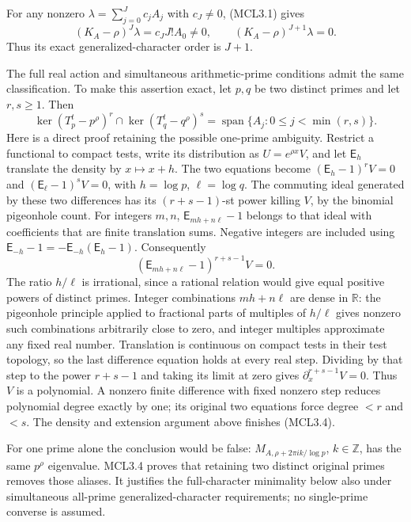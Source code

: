 For any nonzero \(\lambda=\sum_{j=0}^Jc_jA_j\) with \(c_J\ne0\),
(MCL3.1) gives \[
 (K_A-\rho)^J\lambda=c_JJ!A_0\ne0,\qquad
 (K_A-\rho)^{J+1}\lambda=0.
 \tag{MCL3.3}
\] Thus its exact generalized-character order is \(J+1\).

The full real action and simultaneous arithmetic-prime conditions admit
the same classification. To make this assertion exact, let \(p,q\) be
two distinct primes and let \(r,s\ge1\). Then \[
 \boxed{
 \ker(T_p^t-p^\rho)^r\cap\ker(T_q^t-q^\rho)^s
 =\operatorname{span}\{A_j:0\le j<\min(r,s)\}.
 }
 \tag{MCL3.4}
\] Here is a direct proof retaining the possible one-prime ambiguity.
Restrict a functional to compact tests, write its distribution as
\(U=e^{\rho x}V\), and let \(\mathsf E_h\) translate the density by
\(x\mapsto x+h\). The two equations become \((\mathsf E_h-1)^rV=0\) and
\((\mathsf E_\ell-1)^sV=0\), with \(h=\log p\), \(\ell=\log q\). The
commuting ideal generated by these two differences has its
\((r+s-1)\)-st power killing \(V\), by the binomial pigeonhole count.
For integers \(m,n\), \(\mathsf E_{mh+n\ell}-1\) belongs to that ideal
with coefficients that are finite translation sums. Negative integers
are included using \(\mathsf E_{-h}-1=-\mathsf E_{-h}(\mathsf E_h-1)\).
Consequently \[
 (\mathsf E_{mh+n\ell}-1)^{r+s-1}V=0.
\] The ratio \(h/\ell\) is irrational, since a rational relation would
give equal positive powers of distinct primes. Integer combinations
\(mh+n\ell\) are dense in \(\mathbb R\): the pigeonhole principle
applied to fractional parts of multiples of \(h/\ell\) gives nonzero
such combinations arbitrarily close to zero, and integer multiples
approximate any fixed real number. Translation is continuous on compact
tests in their test topology, so the last difference equation holds at
every real step. Dividing by that step to the power \(r+s-1\) and taking
its limit at zero gives \(\partial_x^{r+s-1}V=0\). Thus \(V\) is a
polynomial. A nonzero finite difference with fixed nonzero step reduces
polynomial degree exactly by one; its original two equations force
degree \(<r\) and \(<s\). The density and extension argument above
finishes (MCL3.4).

For one prime alone the conclusion would be false:
\(M_{A,\rho+2\pi i k/\log p}\), \(k\in\mathbb Z\), has the same
\(p^\rho\) eigenvalue. MCL3.4 proves that retaining two distinct
original primes removes those aliases. It justifies the full-character
minimality below also under simultaneous all-prime generalized-character
requirements; no single-prime converse is assumed.

